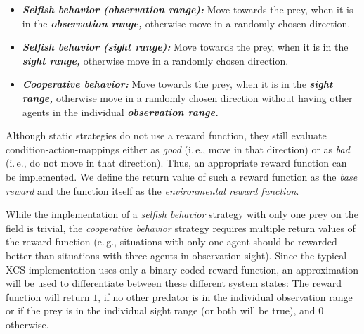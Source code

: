 \begin{itemize}
	\item \emph{\textbf{Selfish behavior (observation range):}} Move towards the prey, when it is in the \emph{\textbf{observation range,}} otherwise move in a randomly chosen direction.
	\item \emph{\textbf{Selfish behavior (sight range):}} Move towards the prey, when it is in the \emph{\textbf{sight range,}} otherwise move in a randomly chosen direction.
	\item \emph{\textbf{Cooperative behavior:}} Move towards the prey, when it is in the \emph{\textbf{sight range,}} otherwise move in a randomly chosen direction without having other agents in the individual \emph{\textbf{observation range.}}
\end{itemize}

Although static strategies do not use a reward function, they still evaluate condition-action-mappings either as \emph{good} (i.\,e., move in that direction) or as \emph{bad} (i.\,e., do not move in that direction). Thus, an appropriate reward function can be implemented. We define the return value of such a reward function as the \emph{base reward} and the function itself as the \emph{environmental reward function}.

While the implementation of a \emph{selfish behavior} strategy with only one prey on the field is trivial, the \emph{cooperative behavior} strategy requires multiple return values of the reward function (e.\,g., situations with only one agent should be rewarded better than situations with three agents in observation sight). Since the typical XCS implementation \cite{BW02} uses only a binary-coded reward function, an approximation will be used to differentiate between these different system states: The reward function will return $1$, if no other predator is in the individual observation range or if the prey is in the individual sight range (or both will be true), and $0$ otherwise. 



